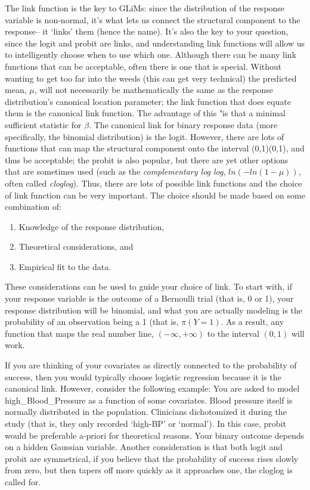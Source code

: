 \documentclass[
]{book}
\providecommand{\tightlist}{%
  \setlength{\itemsep}{0pt}\setlength{\parskip}{0pt}}
\begin{document}
The link function is the key to GLiMs:
since the distribution of the response variable is non-normal,
it's what lets us connect the structural component to the response--
it `links' them (hence the name).
It's also the key to your question, since the logit and probit are links,
and understanding link functions will allow us to intelligently choose when to use which one.
Although there can be many link functions that can be acceptable,
often there is one that is special.
Without wanting to get too far into the weeds (this can get very technical) the predicted mean, \(μ\),
will not necessarily be mathematically the same as
the response distribution's canonical location parameter;
the link function that does equate them is the canonical link function.
The advantage of this "is that a minimal sufficient statistic for \(β\).
The canonical link for binary response data (more specifically, the binomial distribution) is the logit.
However, there are lots of functions that can map the structural component onto the interval (0,1)(0,1),
and thus be acceptable; the probit is also popular, but there are yet
other options that are sometimes used (such as the \emph{complementary log log}, \(ln(−ln(1−μ))\),
often called \emph{cloglog}).
Thus, there are lots of possible link functions and
the choice of link function can be very important.
The choice should be made based on some combination of:

\begin{enumerate}
\def\labelenumi{\arabic{enumi}.}
\tightlist
\item
  Knowledge of the response distribution,
\item
  Theoretical considerations, and
\item
  Empirical fit to the data.
\end{enumerate}

These considerations can be used to guide your choice of link.
To start with, if your response variable is the outcome of a Bernoulli trial (that is, 0 or 1),
your response distribution will be binomial,
and what you are actually modeling is the probability of an observation being a 1
(that is, \(π(Y=1)\).
As a result, any function that maps the real number line, \((−∞,+∞)\)
to the interval \((0,1)\) will work.

If you are thinking of your covariates as directly connected to the probability of success,
then you would typically choose logistic regression
because it is the canonical link.
However, consider the following example:
You are asked to model high\_Blood\_Pressure as a function of some covariates.
Blood pressure itself is normally distributed in the population.
Clinicians dichotomized it during the study
(that is, they only recorded `high-BP' or `normal').
In this case, probit would be preferable a-priori for theoretical reasons.
Your binary outcome depends on a hidden Gaussian variable.
Another consideration is that both logit and probit are symmetrical,
if you believe that the probability of success rises slowly from zero,
but then tapers off more quickly as it approaches one, the cloglog is called for.
\end{document}
